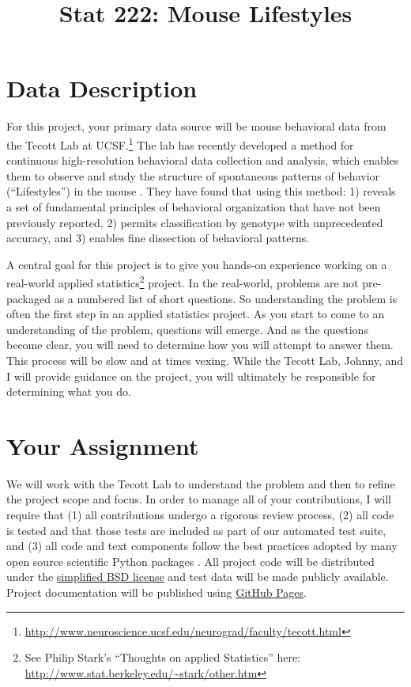 \documentclass[11pt, oneside]{article}   	%
\title{Stat 222: Mouse Lifestyles}
\begin{document}
\maketitle

\section{Data Description}

For this project, your primary data source will be mouse behavioral data from
the Tecott Lab at
UCSF.\footnote{\url{http://www.neuroscience.ucsf.edu/neurograd/faculty/tecott.html}}
The lab has recently developed a method for continuous high-resolution
behavioral data collection and analysis, which enables them to observe and
study the structure of spontaneous patterns of behavior (``Lifestyles'') in the
mouse \cite{tecott2003genes, tecott2004neurobehavioral, goulding2008robust,
anderson2014toward}.  They have found that using this method: 1) reveals a set
of fundamental principles of behavioral organization that have not been
previously reported, 2) permits classification by genotype with unprecedented
accuracy, and 3) enables fine dissection of behavioral patterns.

A central goal for this project is to give you hands-on experience working on a
real-world applied statistics\footnote{See Philip Stark's ``Thoughts on applied
Statistics'' here: \url{http://www.stat.berkeley.edu/~stark/other.htm}}
project.  In the real-world, problems are not pre-packaged as a numbered list
of short questions.  So understanding the problem is often the first step in an
applied statistics project.  As you start to come to an understanding of the
problem, questions will emerge.  And as the questions become clear, you will
need to determine how you will attempt to answer them.  This process will be
slow and at times vexing.  While the Tecott Lab, Johnny, and I will provide
guidance on the project, you will ultimately be responsible for determining
what you do.

\section{Your Assignment}

We will work with the Tecott Lab to understand the problem and then to refine
the project scope and focus.  In order to manage all of your contributions, I
will require that (1) all contributions undergo a rigorous review process, (2)
all code is tested and that those tests are included as part of our automated
test suite, and (3) all code and text components follow the best practices
adopted by many open source scientific Python packages
\cite{millman2014developing}.  All project code will be distributed under the
\href{https://en.wikipedia.org/wiki/BSD_licenses\#2-clause_license_.28.22Simplified_BSD_License.22_or_.22FreeBSD_License.22.29}{simplified
BSD license} and test data will be made publicly available.  Project
documentation will be published using \href{https://pages.github.com/}{GitHub
Pages}.
\end{document}
